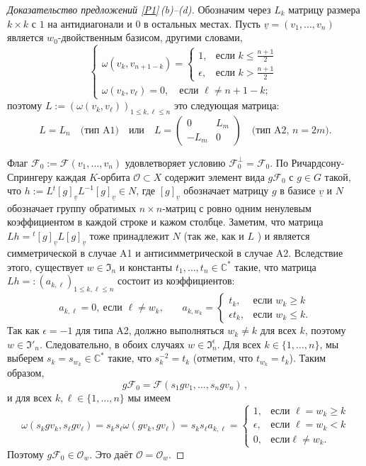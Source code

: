 \documentclass{amsart}
\theoremstyle{definition}
\begin{document}
\begin{proof}[Доказательство предложений \ref{P1}\,{\rm (b)}--{\rm (d)}]
Обозначим через $L_k$ матрицу размера $k\times k$ с $1$ на антидиагонали и $0$ в остальных местах. Пусть
$\underline{v}=(v_1,\ldots,v_n)$ является $w_0$-двойственным базисом, другими словами,
\[
\left\{
\begin{array}{ll}
\omega(v_k,v_{n+1-k})=\left\{\begin{array}{ll}
1, & \mbox{если $k\leq\frac{n+1}{2}$} \\[1mm] \epsilon, & \mbox{если $k>\frac{n+1}{2}$}
\end{array}\right. \\[4mm]
\omega(v_k,v_\ell)=0,\quad\mbox{если $\ell\not=n+1-k$;}
\end{array}
\right.
\]
поэтому  $L:=\left(\omega(v_k,v_\ell)\right)_{1\leq k,\ell\leq n}$ это следующая матрица:
\[
L=L_n\quad \mbox{(тип A1)}\quad\mbox{или}\quad L=\left(\begin{matrix} 0 & L_m \\ -L_m & 0 \end{matrix}\right)\quad\mbox{(тип A2, $n=2m$)}.
\]

Флаг $\mathcal{F}_0:=\mathcal{F}(v_1,\ldots,v_n)$ удовлетворяет условию $\mathcal{F}_0^\perp=\mathcal{F}_0$. По Ричардсону-Спрингеру \cite{Richardson-Springer} каждая $K$-орбита
$\mathcal{O}\subset X$ содержит элемент вида
$g\mathcal{F}_0$ с  $g\in G$ такой, что
$h:=L{}^t[g]_{\underline{v}}L^{-1}[g]_{\underline{v}}\in N$, где
$[g]_{\underline{v}}$ обозначает матрицу $g$ в базисе
$\underline{v}$ и $N$ обозначает группу обратимых $n\times
n$-матриц с ровно одним ненулевым коэффициентом в каждой строке и кажом столбце. Заметим, что матрица
$Lh={}^t[g]_{\underline{v}}L[g]_{\underline{v}}$ тоже принадлежит   $N$
(так же, как и $L$ ) и является симметрической в случае A1 и антисимметрической в
случае A2. Вследствие этого, существует $w\in\mathfrak{I}_n$ и константы
$t_1,\ldots,t_n\in\mathbb{C}^*$ такие, что матрица
$Lh=:\left(a_{k,\ell}\right)_{1\leq k,\ell\leq n}$ состоит из коэффициентов:
\[
a_{k,\ell}=0,\ \mbox{если $\ell\not=w_k$,}\qquad
a_{k,w_k}=\left\{\begin{array}{ll} t_k, & \mbox{если $w_k\geq k$}
\\ \epsilon t_k, & \mbox{если $w_k\leq k$.}
\end{array}\right.
\]
Так как $\epsilon=-1$ для типа A2, должно выполняться $w_k\not=k$ для всех $k$,
поэтому $w\in\mathfrak{I}'_n$. Следовательно, в обоих случаях
$w\in\mathfrak{I}^\epsilon_n$.
Для всех $k\in\{1,\ldots,n\}$, мы
выберем $s_k=s_{w_k}\in\mathbb{C}^*$ такие, что $s_k^{-2}=t_k$
(отметим, что $t_{w_k}=t_k$).
Таким образом,
\[g\mathcal{F}_0=\mathcal{F}(s_1gv_1,\ldots,s_ngv_n)\,,\]
и для всех $k,\ell\in\{1,\ldots,n\}$ мы имеем
\[
\omega(s_kgv_k,s_\ell g
v_\ell)=s_ks_\ell\omega(gv_k,gv_\ell)=s_ks_\ell
a_{k,\ell}=\left\{\begin{array}{ll} 1, & \mbox{если $\ell=w_k\geq k$}
\\ \epsilon, & \mbox{если $\ell=w_k< k$} \\ 0, & \mbox{если
$\ell\not=w_k$}.
\end{array}\right.
\]
Поэтому $g\mathcal{F}_0\in\mathcal{O}_w$. Это даёт
$\mathcal{O}=\mathcal{O}_w$.


\end{proof}
\end{document}
